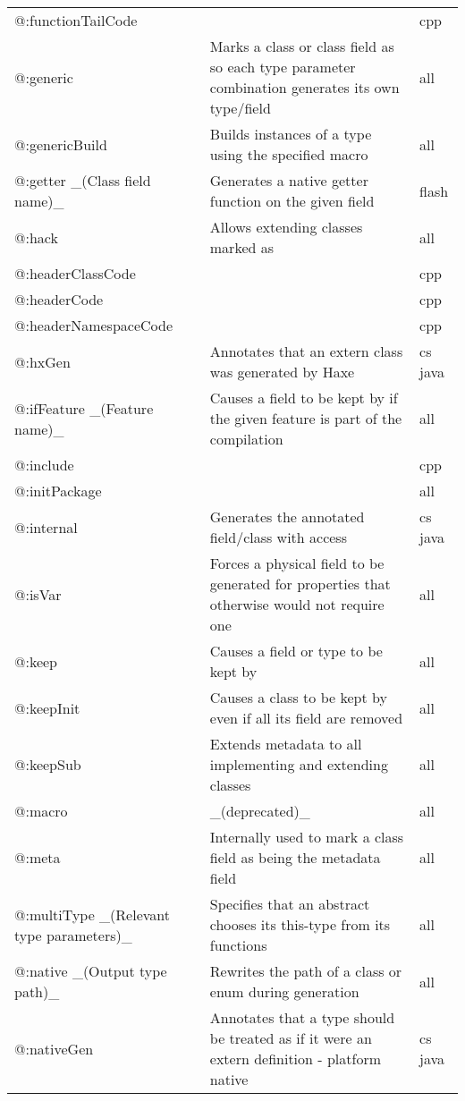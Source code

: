 \begin{center}
\begin{tabular}{| l | l | l |}
	@:functionTailCode  &    &  cpp \\
	@:generic &  Marks a class or class field as \tref{generic}{type-system-generic-type-parameter-construction} so each type parameter combination generates its own type/field  &  all \\
	@:genericBuild  &  Builds instances of a type using the specified macro   &  all \\
	@:getter \_(Class field name)\_  &  Generates a native getter function on the given field   &  flash \\
	@:hack   &  Allows extending classes marked as \expr{@:final}  &  all \\
	@:headerClassCode  &    &  cpp \\
	@:headerCode   &     &  cpp \\
	@:headerNamespaceCode  &    &  cpp \\
	@:hxGen  &  Annotates that an extern class was generated by Haxe  &  cs  java \\
	@:ifFeature \_(Feature name)\_  &  Causes a field to be kept by \tref{DCE}{cr-dce} if the given feature is part of the compilation  &  all \\
	@:include &     &  cpp \\
	@:initPackage  &    &  all \\
	@:internal  &  Generates the annotated field/class with \expr{internal} access  &  cs  java \\
	@:isVar  &  Forces a physical field to be generated for properties that otherwise would not require one  &  all \\
	@:keep   &  Causes a field or type to be kept by \tref{DCE}{cr-dce}  &  all \\
	@:keepInit  &  Causes a class to be kept by \tref{DCE}{cr-dce} even if all its field are removed  &  all \\
	@:keepSub &  Extends \expr{@:keep} metadata to all implementing and extending classes  &  all \\
	@:macro  &  \_(deprecated)\_  &  all \\
	@:meta   &  Internally used to mark a class field as being the metadata field  &  all \\
	@:multiType \_(Relevant type parameters)\_  &  Specifies that an abstract chooses its this-type from its \expr{@:to} functions  &  all \\
	@:native \_(Output type path)\_  &  Rewrites the path of a class or enum during generation  &  all \\
	@:nativeGen  &  Annotates that a type should be treated as if it were an extern definition - platform native  &  cs  java \\

\end{tabular}
\end{center}
